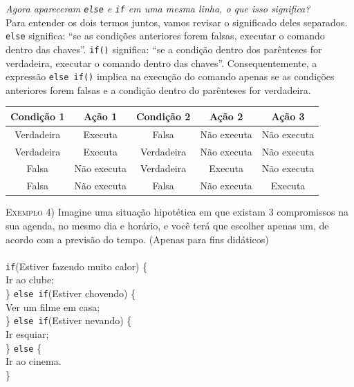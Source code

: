     \textit{Agora apareceram \texttt{else} e \texttt{if} em uma mesma linha, o que isso significa?} \\
    Para entender os dois termos juntos, vamos revisar o significado deles separados. \texttt{else} significa: ``se as condições anteriores forem falsas, executar o comando dentro das chaves''. \texttt{if()} significa: ``se a condição dentro dos parênteses for verdadeira, executar o comando dentro das chaves''. Consequentemente, a expressão \texttt{else if()} implica na execução do comando apenas se as condições anteriores forem falsas e a condição dentro do parênteses for verdadeira.
    
    \begin{center}
    \begin{tabular}{|c|c|c|c|c|}
    \hline
    Condição 1 & Ação 1 & Condição 2 & Ação 2 & Ação 3\\ \hline
    Verdadeira & Executa & Falsa & Não executa & Não executa \\ \hline
    Verdadeira & Executa & Verdadeira & Não executa & Não executa \\ \hline
    Falsa & Não executa & Verdadeira & Executa & Não executa \\ \hline
    Falsa & Não executa & Falsa & Não executa & Executa \\ \hline
    \end{tabular}
    \end{center}
    
    \textsc{Exemplo 4)} Imagine uma situação hipotética em que existam 3 compromissos na sua agenda, no mesmo dia e horário, e você terá que escolher apenas um, de acordo com a previsão do tempo. (Apenas para fins didáticos)
    \\
    \\
    \noindent \texttt{if}(Estiver fazendo muito calor) \{ \\
    \indent Ir ao clube; \\
    \} \texttt{else if}(Estiver chovendo) \{ \\
    \indent Ver um filme em casa;\\
    \} \texttt{else if}(Estiver nevando) \{ \\
    \indent Ir esquiar;\\
    \} \texttt{else} \{ \\
    \indent Ir ao cinema.\\
    \}\\
    
